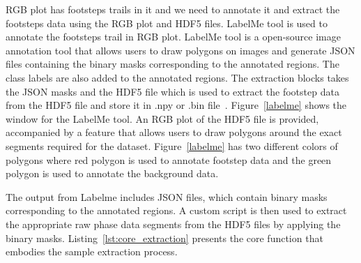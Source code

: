 RGB plot has footsteps trails in it and we need to annotate it and extract the footsteps data using the RGB plot and HDF5 files. LabelMe tool is used to annotate the footsteps trail in RGB plot. LabelMe tool is a open-source image annotation tool that allows users to draw polygons on images and generate JSON files containing the binary masks corresponding to the annotated regions. The class labels are also added to the annotated regions. The extraction blocks takes the JSON masks and the HDF5 file which is used to extract the footstep data from the HDF5 file and store it in .npy or .bin file~\cite{Labelme}. Figure~\ref{labelme} shows the window for the LabelMe tool. An RGB plot of the HDF5 file is provided, accompanied by a feature that allows users to draw polygons around the exact segments required for the dataset. Figure~\ref{labelme} has two different colors of polygons where red polygon is used to annotate footstep data and the green polygon is used to annotate the background data.

The output from Labelme includes JSON files, which contain binary masks corresponding to the annotated regions. A custom script is then used to extract the appropriate raw phase data segments from the HDF5 files by applying the binary masks. Listing~\ref{lst:core_extraction} presents the core function that embodies the sample extraction process.

